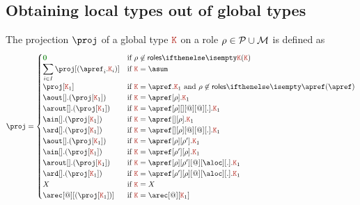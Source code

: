 \subsection{Obtaining local types out of global types}
The projection $\proj$ of a global type $\aK$ on a role
$\rho \in \mathcal{P} \cup \mathcal{M}$ is defined as
\[
  \proj =
  \begin{cases}
    \nil & \text{if } \arole \not \in \roles \aK
    \\
    \displaystyle{\sum_{i\in I}{\proj[(\apref_i.\aK_i)]}}
    &
    \text{if } \aK = \asum
    \\
    \proj[\aK_1]
    &
    \text{if } \aK = \apref.\aK_1 \text{ and } \rho\not\in\roles{\apref}
    \\
    \aout[].(\proj[\aK_1])
    &
    \text{if } \aK = \apref[\arole].\aK_1
    \\
    \arout[].(\proj[\aK_1])
    &
    \text{if } \aK = \apref[\arole][{}][@][@][.].\aK_1
    \\
    \ain[].(\proj[\aK_1])
    &
    \text{if } \aK = \apref[{}][\arole].\aK_1
    \\
    \ard[].(\proj[\aK_1])
    &
    \text{if }  \aK = \apref[{}][\arole][@][@][.].\aK_1
    \\
    \aout[].(\proj[\aK_1])
    &
    \text{if } \aK = \apref[\arole][\arole'].\aK_1
    \\
    \ain[].(\proj[\aK_1])
    &
    \text{if } \aK = \apref[\arole'][\arole].\aK_1
    \\
    \arout[].(\proj[\aK_1])
    &
    \text{if } \aK = \apref[\arole][\arole'][@][\aloc][.].\aK_1
    \\
    \ard[].(\proj[\aK_1])
    &
    \text{if } \aK = \apref[\arole'][\arole][@][\aloc][.].\aK_1
    \\
    X
    & \text{if } \aK = X
    \\
    \arec[@][{(\proj[\aK_1])}]
    &
    \text{if } \aK = \arec[@][\aK_1]
  \end{cases}
\]


